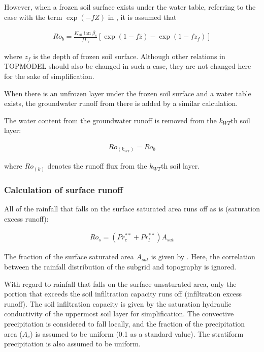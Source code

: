 However, when a frozen soil surface exists under the water table, referring to the case with the term \(\exp(-fZ)\) in \hyperref[eq262]{}, it is assumed that

\begin{eqnarray}
Ro_b = \frac{K_{s0} \tan\beta_s}{f L_s}
  [ \exp(1-f \overline{z}) - \exp(1-f z_f) ]
  \label{eq281}
\end{eqnarray}

where \(z_f\) is the depth of frozen soil surface. Although other relations in TOPMODEL should also be changed in such a case, they are not changed here for the sake of simplification.

When there is an unfrozen layer under the frozen soil surface and a water table exists, the groundwater runoff from there is added by a similar calculation.

The water content from the groundwater runoff is removed from the \(k_{WT}\)th soil layer:

\begin{eqnarray}
Ro_{(k_{WT})} = Ro_b
\label{eq282}
\end{eqnarray}

where \(Ro_{(k)}\) denotes the runoff flux from the \(k_{WT}\)th soil layer.

\subsubsection{Calculation of surface runoff}\label{calculation-of-surface-runoff}

All of the rainfall that falls on the surface saturated area runs off as is (saturation excess runoff):

\begin{eqnarray}
Ro_s = (Pr_c^{\ast\ast} + Pr_l^{\ast\ast}) A_{sat}
\label{eq283}
\end{eqnarray}

The fraction of the surface saturated area \(A_{sat}\) is given by \hyperref[eq276]{}. Here, the correlation between the rainfall distribution of the subgrid and topography is ignored.

With regard to rainfall that falls on the surface unsaturated area, only the portion that exceeds the soil infiltration capacity runs off (infiltration excess runoff). The soil infiltration capacity
is given by the saturation hydraulic conductivity of the uppermost soil layer for simplification. The convective precipitation is considered to fall locally, and the fraction of the precipitation area
(\(A_c\)) is assumed to be uniform (0.1 as a standard value). The stratiform precipitation is also assumed to be uniform.


